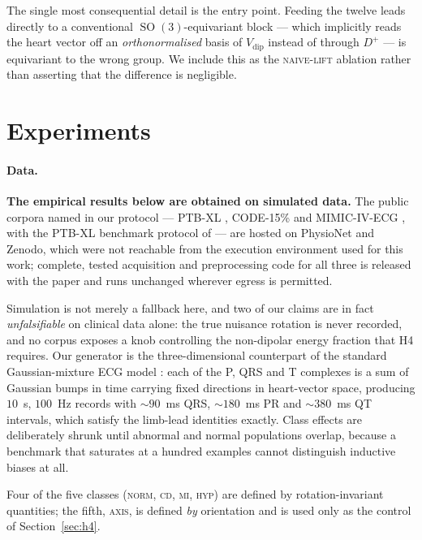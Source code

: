 \documentclass[11pt]{article}
\theoremstyle{definition}
\DeclareMathOperator{\SO}{SO}
\newcommand{\Vdip}{V_{\mathrm{dip}}}
\begin{document}
The single most consequential detail is the entry point. Feeding the twelve leads
directly to a conventional $\SO(3)$-equivariant block --- which implicitly reads the
heart vector off an \emph{orthonormalised} basis of $\Vdip$ instead of through $D^{+}$
--- is equivariant to the wrong group. We include this as the \textsc{naive-lift}
ablation rather than asserting that the difference is negligible.

\section{Experiments}\label{sec:exp}

\paragraph{Data.} \textbf{The empirical results below are obtained on simulated data.}
The public corpora named in our protocol --- PTB-XL \citep{wagner2020ptbxl}, CODE-15\%
\citep{ribeiro2020code} and MIMIC-IV-ECG \citep{gow2023mimicecg}, with the PTB-XL
benchmark protocol of \citet{strodthoff2021benchmark} --- are hosted on PhysioNet and
Zenodo, which were not reachable from the execution environment used
for this work; complete, tested acquisition and preprocessing code for all three is
released with the paper and runs unchanged wherever egress is permitted.

Simulation is not merely a fallback here, and two of our claims are in fact
\emph{unfalsifiable} on clinical data alone: the true nuisance rotation is never
recorded, and no corpus exposes a knob controlling the non-dipolar energy fraction
that H4 requires. Our generator is the three-dimensional counterpart of the standard
Gaussian-mixture ECG model \citep{mcsharry2003}: each of the P, QRS and T complexes is a sum of Gaussian
bumps in time carrying fixed directions in heart-vector space, producing $10$~s,
$100$~Hz records with $\sim$$90$~ms QRS, $\sim$$180$~ms PR and $\sim$$380$~ms QT
intervals, which satisfy the limb-lead identities exactly. Class effects are
deliberately shrunk until abnormal and normal populations overlap, because a benchmark
that saturates at a hundred examples cannot distinguish inductive biases at all.

Four of the five classes (\textsc{norm}, \textsc{cd}, \textsc{mi}, \textsc{hyp}) are
defined by rotation-invariant quantities; the fifth, \textsc{axis}, is defined \emph{by}
orientation and is used only as the control of Section~\ref{sec:h4}.
\end{document}
